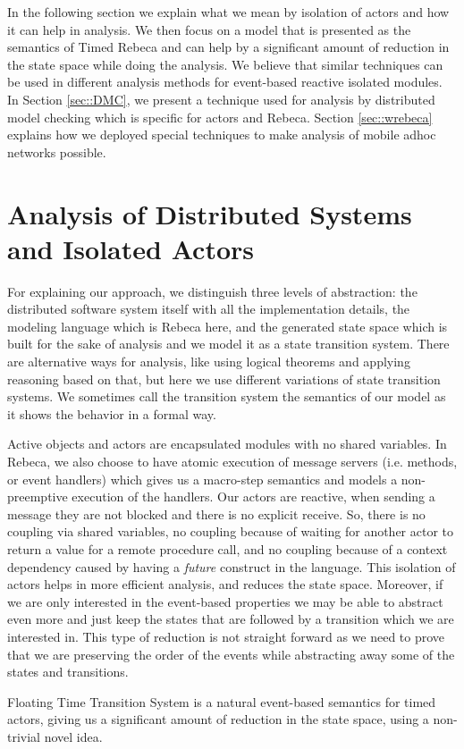 In the following section we explain what we mean by isolation of actors and how it can help in analysis. We then focus on a model that is presented as the semantics of Timed Rebeca and can help by a significant amount of reduction in the state space while doing the analysis. We believe that similar techniques can be used in different analysis methods for event-based reactive isolated modules. 
%
In Section \ref{sec::DMC}, we present a technique used for analysis by distributed model checking which is specific for actors and Rebeca.
%
Section \ref{sec::wrebeca} explains how we deployed special techniques to make analysis of  mobile adhoc networks possible.

\section{Analysis of Distributed Systems and Isolated Actors}
For explaining our approach, we distinguish three levels of abstraction: the distributed software system itself with all the implementation details, the modeling language which is Rebeca here, and the generated state space which is built for the sake of analysis and  we model it as a state transition system. There are alternative ways for analysis, like using logical theorems and applying reasoning based on that, but here we use different variations of state transition systems.
We sometimes call the transition system the semantics of our model as it shows the behavior in a formal way.


Active objects and actors are encapsulated modules with no shared variables. In Rebeca, we also choose to have atomic execution of message servers (i.e. methods, or event handlers) which gives us a macro-step semantics and models a non-preemptive execution of the handlers.
Our actors are reactive, when sending a message they are not blocked and there is no explicit receive. So, there is no coupling via shared variables, no coupling because of waiting for another actor to return a value for a remote procedure call, and no coupling because of a context dependency caused by having a \textit{future}  construct in the language.
This isolation of actors helps in more efficient analysis, and reduces the state space.
Moreover, if we are only interested in the event-based properties we may be able to abstract even more and just keep the states that are followed by a transition which we are interested in. This type of reduction is not straight forward as we need to prove that we are preserving the order of the events while abstracting away some of the states and transitions. 

Floating Time Transition System is a natural event-based semantics for timed actors, giving us a significant amount of reduction in the state space, using a non-trivial novel idea.
	